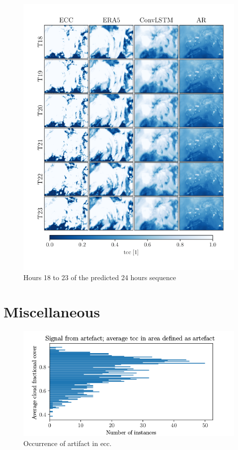 \begin{figure}[ht]
    \centering
    \includegraphics{python_figs/comparing_seq_part_4_of4_jan2.png}
    \caption{Hours 18 to 23 of the predicted 24 hours sequence }
    \label{fig:part4/4}
\end{figure}

\cleardoublepage
\chapter{Miscellaneous} \label{app:misc}
\begin{figure}[ht]
    \centering
    \includegraphics{python_figs/signal_artefact.png}
    \caption{Occurrence of artifact in \acrshort{ecc}.}
    \label{fig:signal_artefact}
\end{figure}

